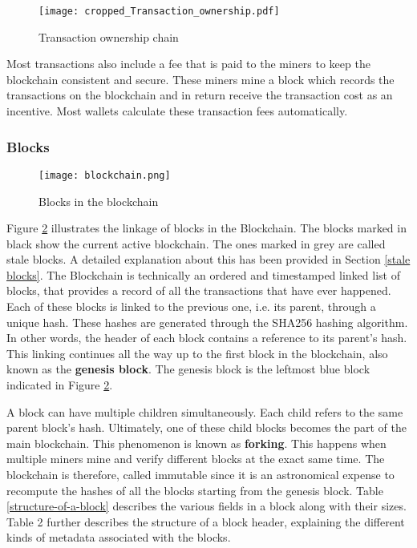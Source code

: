 \documentclass[english]{tktltiki}
\begin{document}
\begin{figure}[H]
\begin{center}
\texttt{[image: cropped\_Transaction\_ownership.pdf]}
\caption{Transaction ownership chain}
\label{Transaction ownership chain}
\end{center}
\end{figure}

Most transactions also include a fee that is paid to the miners to keep the blockchain consistent and secure. These miners mine a block which records the transactions on the blockchain and in return receive the transaction cost as an incentive. Most wallets calculate these transaction fees automatically.

\subsubsection{Blocks}


\begin{figure}[H]
\begin{center}
\texttt{[image: blockchain.png]}
\caption{Blocks in the blockchain}
\label{blocks}
\end{center}
\end{figure}

Figure \ref{blocks} illustrates the linkage of blocks in the Blockchain. The blocks marked in black show the current active blockchain. The ones marked in grey are called stale blocks. A detailed explanation about this has been provided in Section \ref{stale blocks}. The Blockchain is technically an ordered and timestamped linked list of blocks, that provides a record of all the transactions that have ever happened. Each of these blocks is linked to the previous one, i.e. its parent, through a unique hash. These hashes are generated through the SHA256 hashing algorithm. In other words, the header of each block contains a reference to its parent's hash. This linking continues all the way up to the first block in the blockchain, also known as the \textbf{genesis block}. The genesis block is the leftmost blue block indicated in Figure \ref{blocks}. 

A block can have multiple children simultaneously. Each child refers to the same parent block's hash. Ultimately, one of these child blocks becomes the part of the main blockchain. This phenomenon is known as \textbf{forking}. This happens when multiple miners mine and verify different blocks at the exact same time. The blockchain is therefore, called immutable since it is an astronomical expense to recompute the hashes of all the blocks starting from the genesis block. Table \ref{structure-of-a-block} describes the various fields in a block along with their sizes. Table 2 further describes the structure of a block header, explaining the different kinds of metadata associated with the blocks. 
\newline
\end{document}
